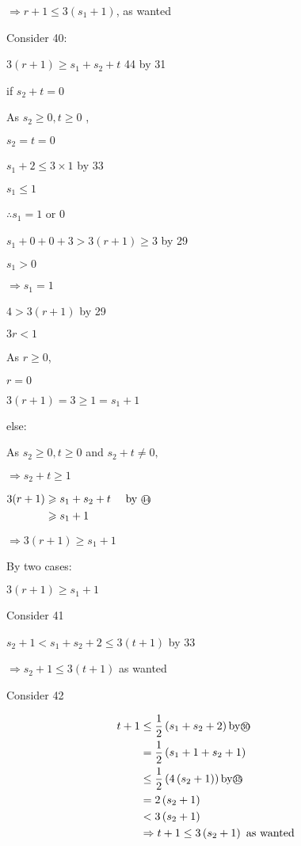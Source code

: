 \documentclass[12pt]{article}
\begin{document}
$\Rightarrow r+1 \leq 3(s_1+1)$, as wanted

Consider {\small\textcircled{\scriptsize{40}}}:

$3(r+1) \geqslant s_{1}+s_{2}+t$  {\small\textcircled{\scriptsize{44}}} by {\small\textcircled{\scriptsize{31}}}

 if $s_{2}+t=0$ 
 
As  $s_{2} \geqslant 0, t \geqslant 0$ ,

$ s_{2}=t=0$

$ s_{1}+2 \leq 3 \times 1$   by {\small\textcircled{\scriptsize{33}}}

$ s_{1} \leq 1 $

$ \therefore s_{1}=1$ or  0 

$ s_{1}+0+0+3>3(r+1) \geqslant 3$ by {\small\textcircled{\scriptsize{29}}}

$s_{1}>0 $

$ \Rightarrow s_{1}=1 $

$ 4>3(r+1)$  by {\small\textcircled{\scriptsize{29}}}

$3 r<1$

As $r \geqslant 0$,

$r=0$

$3(r+1) = 3 \geqslant 1=s_{1}+1$

else:

As $s_{2} \geqslant 0, t \geqslant 0$ and $s_{2}+t \neq 0, $

$ \Rightarrow s_{2}+t \geqslant 1 $

$\begin{aligned}
 3(r+1) &\geqslant s_{1}+s_{2}+t \quad \text { by {\small\textcircled{\scriptsize{44}}} } \\
&\geqslant s_{1}+1 
\end{aligned}$

$ \Rightarrow 3(r+1) \geqslant s_{1}+1 $

 By  two  cases:

$ 3(r+1) \geqslant s_{1}+1$

Consider {\small\textcircled{\scriptsize{41}}}

$s_{2}+1<s_{1}+s_{2}+2 \leq 3(t+1)$ by {\small\textcircled{\scriptsize{33}}}

$ \Rightarrow s_{2}+1 \leq 3(t+1)$ as wanted 


Consider {\small\textcircled{\scriptsize{42}}}

$$
\begin{aligned}
 t+1 &\leq \frac{1}{2}\left(s_{1}+s_{2}+2\right) \text {by{\small\textcircled{\scriptsize{30}}} }\\
&=\frac{1}{2}\left(s_{1}+1+s_{2}+1\right) \\
& \leq \frac{1}{2}\left(4\left(s_{2}+1\right)\right) \text {by{\small\textcircled{\scriptsize{35}}} }\\
&=2\left(s_{2}+1\right) \\
&<3\left(s_{2}+1\right) \\
& \Rightarrow t+1 \leq 3\left(s_{2}+1\right) \text { as  wanted} \\
\end{aligned}
$$
\end{document}
